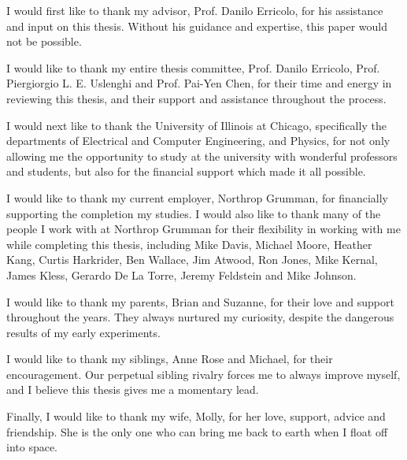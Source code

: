 \acknowledgment

I would first like to thank my advisor, Prof. Danilo Erricolo, for his assistance and input on this thesis. Without his guidance and expertise, this paper would not be possible. 

I would like to thank my entire thesis committee, Prof. Danilo Erricolo, Prof. Piergiorgio L. E. Uslenghi and Prof. Pai-Yen Chen, for their time and energy in reviewing this thesis, and their support and assistance throughout the process. 

I would next like to thank the University of Illinois at Chicago, specifically the departments of Electrical and Computer Engineering, and Physics, for not only allowing me the opportunity to study at the university with wonderful professors and students, but also for the financial support which made it all possible. 

I would like to thank my current employer, Northrop Grumman, for financially supporting the completion my studies. I would also like to thank many of the people I work with at Northrop Grumman for their flexibility in working with me while completing this thesis, including Mike Davis, Michael Moore, Heather Kang, Curtis Harkrider, Ben Wallace, Jim Atwood, Ron Jones, Mike Kernal, James Kless, Gerardo De La Torre, Jeremy Feldstein and Mike Johnson. 

I would like to thank my parents, Brian and Suzanne, for their love and support throughout the years. They always nurtured my curiosity, despite the dangerous results of my early experiments. 

I would like to thank my siblings, Anne Rose and Michael, for their encouragement. Our perpetual sibling rivalry forces me to always improve myself, and I believe this thesis gives me a momentary lead. 

Finally, I would like to thank my wife, Molly, for her love, support, advice and friendship. She is the only one who can bring me back to earth when I float off into space. 
\\
\\
\\
\\
\\
